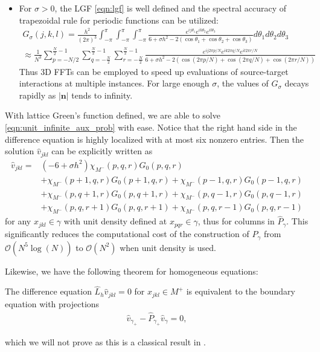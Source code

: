 \begin{itemize}
\item For $\sigma>0$, the LGF \eqref{eqn:lgf} is well defined and the spectral accuracy of trapezoidal rule for periodic functions can be utilized:
\begin{subequations}
\begin{align}
G_{\sigma}(j,k,l)=\frac{h^2}{(2\pi)^3}\int_{-\pi}^{\pi}\int_{-\pi}^{\pi}\int_{-\pi}^{\pi} \frac{e^{ij\theta_1}e^{ik\theta_2}e^{il\theta_3}}{6+\sigma h^2  - 2(\cos\theta_1+\cos\theta_2+\cos\theta_3)}d\theta_1d\theta_2d\theta_3\\
\approx\frac{1}{N^3}\sum_{p=-N/2}^{\frac{N}{2}-1}\sum_{q=-\frac{N}{2}}^{\frac{N}{2}-1}\sum_{r=-\frac{N}{2}}^{\frac{N}{2}-1} \frac{e^{ij2\pi p/N}e^{ik2\pi q/N}e^{il2\pi r/N}}{6+\sigma h^2  - 2(\cos(2\pi p/N)+\cos(2\pi q/N)+\cos(2\pi r/N))}
\end{align}
\end{subequations}
Thus 3D FFTs can be employed to speed up evaluations of source-target interactions at multiple instances. For large enough $\sigma$, the values of $G_\sigma$ decays rapidly as $|\bm{n}|$ tends to infinity.

\end{itemize}

With lattice Green's function defined, we are able to solve \eqref{eqn:unit_infinite_aux_prob} with ease.
Notice that the right hand side in the difference equation is highly localized with at most six nonzero entries. Then the solution $\hat{v}_{jkl}$ can be explicitly written as
\begin{align}
\hat{v}_{jkl} =& (-6+\sigma h^2)\chi_{M^-}(p,q,r)G_0(p,q,r)\nonumber\\
&+\chi_{M^-}(p+1,q,r)G_0(p+1,q,r) +\chi_{M^-}(p-1,q,r)G_0(p-1,q,r) \nonumber\\
&+\chi_{M^-}(p,q+1,r)G_0(p,q+1,r) +\chi_{M^-}(p,q-1,r)G_0(p,q-1,r) \nonumber\\
&+\chi_{M^-}(p,q,r+1)G_0(p,q,r+1) +\chi_{M^-}(p,q,r-1)G_0(p,q,r-1) 
\end{align}
for any $x_{jkl}\in \gamma$ with unit density defined at $x_{pqr}\in\gamma$, thus for columns in $\widehat{P}_\gamma$. This significantly reduces the computational cost of the construction of $\widehat{P}_\gamma$ from $\mathcal{O}(N^5\log(N))$ to $\mathcal{O}(N^2)$ when unit density is used.

Likewise, we have the following theorem for homogeneous equations:
\begin{theorem}
The difference equation $\widehat{L}_h\hat{v}_{jkl}=0$ for $x_{jkl}\in M^+$ is equivalent to the boundary equation with projections
\begin{align}\label{eqn:inf_veq}
\hat{v}_{\gamma_+}-\widehat{P}_{\gamma_+}\hat{v}_{\gamma} = 0,
\end{align}
\end{theorem}
which we will not prove as this is a classical result in \cite{ryaben2012method}.

